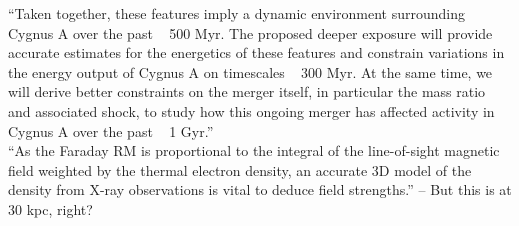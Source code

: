 \documentclass[MScProj_TLRH_ClusterEnergy.tex]{subfiles}
\begin{document}
``Taken together, these features imply a dynamic environment surrounding Cygnus A over the past ~ 500 Myr. The proposed deeper exposure will provide accurate estimates for the energetics of these features and constrain variations in the energy output of Cygnus A on timescales ~ 300 Myr. At the same time, we will derive better constraints on the merger itself, in particular the mass ratio and associated shock, to study how this ongoing merger has affected activity in Cygnus A over the past ~ 1 Gyr.'' \\

``As the Faraday RM is proportional to the integral of the line-of-sight magnetic field weighted by the thermal electron density, an accurate 3D model of the density from X-ray observations is vital to deduce field strengths.'' -- But this is at 30 kpc, right?


\SubfileBibliography
\end{document}
